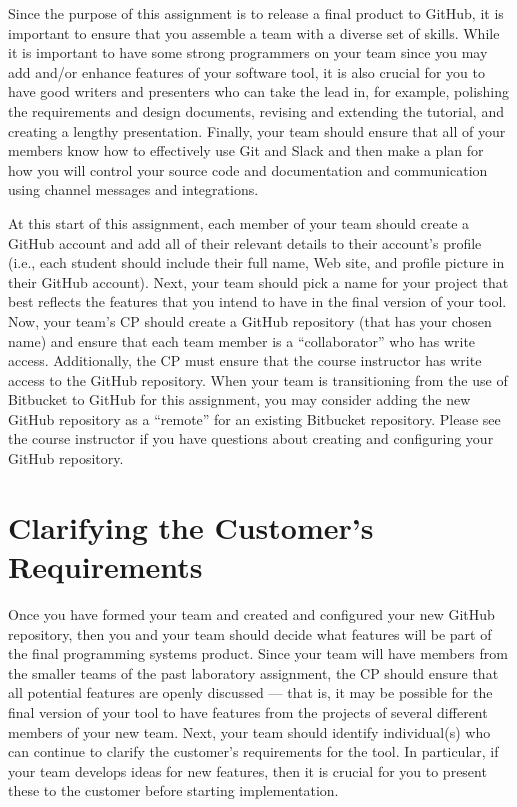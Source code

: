 Since the purpose of this assignment is to release a final product to GitHub, it is important to ensure that you
assemble a team with a diverse set of skills. While it is important to have some strong programmers on your team since
you may add and/or enhance features of your software tool, it is also crucial for you to have good writers and
presenters who can take the lead in, for example, polishing the requirements and design documents, revising and
extending the tutorial, and creating a lengthy presentation.  Finally, your team should ensure that all of your members
know how to effectively use Git and Slack and then make a plan for how you will control your source code and
documentation and communication using channel messages and integrations.

At this start of this assignment, each member of your team should create a GitHub account and add all of their relevant
details to their account's profile (i.e., each student should include their full name, Web site, and profile picture in
their GitHub account).  Next, your team should pick a name for your project that best reflects the features that you
intend to have in the final version of your tool. Now, your team's CP should create a GitHub repository (that has your
chosen name) and ensure that each team member is a ``collaborator'' who has write access. Additionally, the CP must
ensure that the course instructor has write access to the GitHub repository. When your team is transitioning from the
use of Bitbucket to GitHub for this assignment, you may consider adding the new GitHub repository as a ``remote'' for an
existing Bitbucket repository. Please see the course instructor if you have questions about creating and configuring
your GitHub repository.

\section*{Clarifying the Customer's Requirements}

Once you have formed your team and created and configured your new GitHub repository, then you and your team should
decide what features will be part of the final programming systems product. Since your team will have members from the
smaller teams of the past laboratory assignment, the CP should ensure that all potential features are openly discussed
--- that is, it may be possible for the final version of your tool to have features from the projects of several
different members of your new team. Next, your team should identify individual(s) who can continue to clarify the
customer's requirements for the tool. In particular, if your team develops ideas for new features, then it is crucial
for you to present these to the customer before starting implementation.

